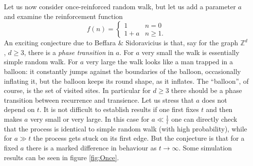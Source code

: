 \documentclass{emsprocart}
\theoremstyle{plain}
\begin{document}
Let us now consider once-reinforced random walk, but let us add a
parameter $a$ and examine the reinforcement function 
\[
f(n)=\begin{cases}
1 & n=0\\
1+a & n\ge1.
\end{cases}
\]
An exciting conjecture due to Beffara \& Sidoravicius is that, say for the graph
$\mathbb{Z}^{d}$, $d\ge 3$, there is a \emph{phase transition} in
$a$. For $a$ very small the walk is essentially simple random walk.
For $a$ very large the walk looks like a man trapped in a balloon:
it constantly jumps against the boundaries of the balloon, occasionally
inflating it, but the balloon keeps its round shape, as it inflates.
The ``balloon'', of course, is the set of visited sites. In particular
for $d\ge 3$ there should be a phase transition between recurrence and
transience. Let us stress
that $a$ does not depend on $t$. It is not difficult to establish
results if one first fixes $t$ and then makes $a$ very small or
very large. In this case for $a\ll\frac{1}{t}$ one can directly check
that the process is identical to simple random walk (with high probability),
while for $a\gg t$ the process gets stuck on its first edge. But
the conjecture is that for a fixed $a$ there is a marked difference
in behaviour as $t\to\infty$. Some simulation results can be seen
in figure \ref{fig:Once}. 
\newdimen\figwid
{}\columnwidth
\end{document}

